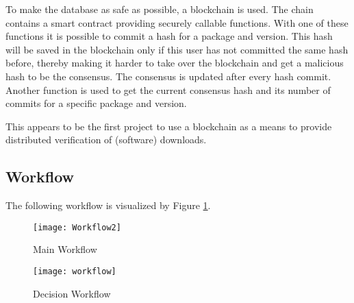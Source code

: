 To make the database as safe as possible, a blockchain is used. The chain contains a smart contract providing securely callable functions. With one of these functions it is possible to commit a hash for a package and version. This hash will be saved in the blockchain only if this user has not committed the same hash before, thereby making it harder to take over the blockchain and get a malicious hash to be the consensus. The consensus is updated after every hash commit. Another function is used to get the current consensus hash and its number of commits for a specific package and version.

This appears to be the first project to use a blockchain as a means to provide distributed verification of (software) downloads.

\subsection*{Workflow}
\label{sec:workflow}
The following workflow is visualized by Figure \ref{fig:main_workflow}.
\begin{figure}
	\centering
		\texttt{[image: Workflow2]}
	\caption{Main Workflow}
	\label{fig:main_workflow}
\end{figure}

\begin{figure}
	\centering
		\texttt{[image: workflow]}
	\caption{Decision Workflow}
	\label{fig:decision_workflow}
\end{figure}


